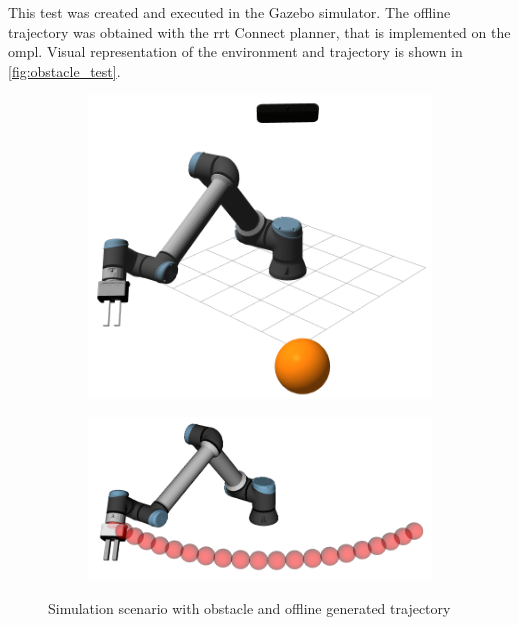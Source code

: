 \par This test was created and executed in the Gazebo simulator. The offline trajectory was obtained with the \ac{rrt} Connect planner, that is implemented on the \ac{ompl}. Visual representation of the environment and trajectory is shown in \autoref{fig:obstacle_test}.

\begin{figure}[h]
    \centering
    \begin{subfigure}{.5\linewidth}
        \centering
        \includegraphics[width=.85\linewidth]{figs/chp6/traj_gazebo_obstacle.png}
    \end{subfigure}%
    \begin{subfigure}{.5\linewidth}
        \centering
        \includegraphics[width=\linewidth]{figs/chp6/traj_rviz.png}
    \end{subfigure}
    \caption{Simulation scenario with obstacle and offline generated trajectory}
    \label{fig:obstacle_test}
\end{figure}

